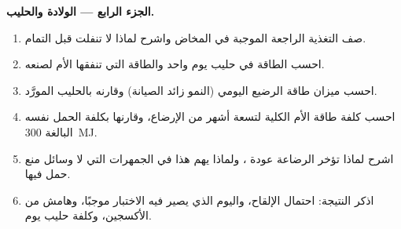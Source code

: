 \begin{problem}
\medskip
\noindent\textbf{الجزء الرابع --- الولادة والحليب.}
\begin{enumerate}[resume]
  \item صف التغذية الراجعة الموجبة في المخاض واشرح لماذا لا
        تنفلت قبل التمام.
  \item احسب الطاقة في حليب يوم واحد والطاقة التي تنفقها
        الأم لصنعه.
  \item احسب ميزان طاقة الرضيع اليومي (النمو زائد
        الصيانة) وقارنه بالحليب المورَّد.
  \item احسب كلفة طاقة الأم الكلية لتسعة أشهر من
        الإرضاع، وقارنها بكلفة الحمل نفسه البالغة \qty{300}{MJ}.
  \item اشرح لماذا تؤخر الرضاعة عودة ، ولماذا يهم
        هذا في الجمهرات التي لا وسائل منع حمل فيها.
  \item اذكر النتيجة: احتمال الإلقاح، واليوم الذي يصير فيه
        الاختبار موجبًا، وهامش  من الأكسجين، وكلفة حليب يوم.
\end{enumerate}
\end{problem}
